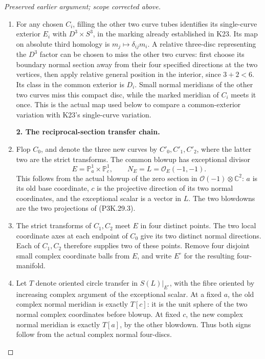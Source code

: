\begin{proof}[Preserved earlier argument; scope corrected above]
\begin{enumerate}[label=\arabic*.]
\item For any chosen \(C_i\), filling the other two curve tubes identifies
its single-curve exterior \(E_i\) with \(D^3\times S^3\), in the
marking already established in K23. Its map on absolute third
homology is \(m_j\mapsto\delta_{ij}m_i\). A relative three-disc
representing the \(D^3\) factor can be chosen to miss the other two
curves: first choose its boundary normal section away from their
four specified directions at the two vertices, then apply relative
general position in the interior, since \(3+2<6\).
Its class in the common exterior is \(D_i\). Small normal
meridians of the other two curves miss this compact disc, while
the marked meridian of \(C_i\) meets it once. This is the actual
map used below to compare a common-exterior variation with K23's
single-curve variation.

\par\medskip\noindent\textbf{2. The reciprocal-section transfer chain.}\enspace

\item Flop \(C_0\), and denote the three new curves by \(C'_0,C'_1,C'_2\),
where the latter two are the strict transforms. The common blowup
has exceptional divisor
\[
          E=\mathbb P^1_a\times\mathbb P^1_c,\qquad
          N_E=L=\mathcal O_E(-1,-1).
                                                        \tag{P3K.29.3}
\]
This follows from the actual blowup of the zero section in
\(\mathcal O(-1)\otimes\mathbb C^2\): \(a\) is its old base
coordinate, \(c\) is the projective direction of its two normal
coordinates, and the exceptional scalar is a vector in \(L\).
The two blowdowns are the two projections of (P3K.29.3).

\item The strict transforms of \(C_1,C_2\) meet \(E\) in four distinct
points. The two local coordinate axes at each endpoint of \(C_0\)
give its two distinct normal directions. Each of \(C_1,C_2\)
therefore supplies two of these points. Remove four disjoint
small complex coordinate balls from \(E\), and write \(E^\circ\)
for the resulting four-manifold.

\item Let \(T\) denote oriented circle transfer in \(S(L)|_{E^\circ}\),
with the fibre oriented by increasing complex argument of the
exceptional scalar. At a fixed \(a\), the old complex normal
meridian is exactly \(T[c]\): it is the unit sphere of the two
normal complex coordinates before blowup. At fixed \(c\), the new
complex normal meridian is exactly \(T[a]\), by the other blowdown.
Thus both signs follow from the actual complex normal four-discs.


\end{enumerate}
\end{proof}
